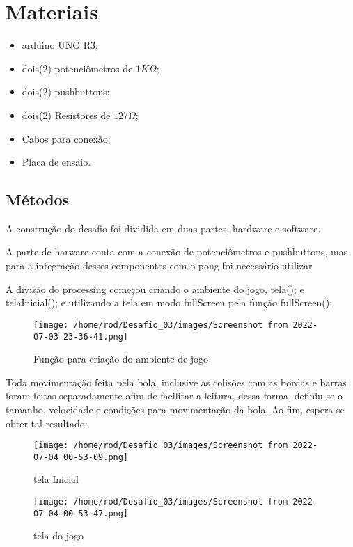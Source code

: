 \documentclass[conference]{IEEEtran}
\begin{document}
\section{Materiais}
 \begin{itemize}
     \item arduino UNO R3;
     \item dois(2) potenciômetros de $ 1K\Omega $;
     \item dois(2) pushbuttons;
     \item dois(2) Resistores de $ 127\Omega $;
     \item Cabos para conexão;
     \item Placa de ensaio.
 \end{itemize}

\subsection{Métodos}
A construção do desafio foi dividida em duas partes, hardware e software. 

A parte de harware conta com a conexão de potenciômetros e pushbuttons, mas para a integração desses componentes com o pong
foi necessário utilizar 

A divisão do processing começou criando o ambiente do jogo, tela(); e telaInicial(); e utilizando a tela em modo fullScreen
pela função fullScreen();


 \begin{figure}[htbp]
    \centerline{\texttt{[image: /home/rod/Desafio\_03/images/Screenshot from 2022-07-03 23-36-41.png]}}
    \caption{Função para criação do ambiente de jogo}
    \label{fig}
    \end{figure}


Toda movimentação feita pela bola, inclusive as colisões com as bordas e barras foram feitas separadamente afim de 
facilitar a leitura, dessa forma, definiu-se o tamanho, velocidade e condições para movimentação da bola. Ao fim, 
espera-se obter tal resultado:

\begin{figure}[htbp]
    \centerline{\texttt{[image: /home/rod/Desafio\_03/images/Screenshot from 2022-07-04 00-53-09.png]}}
    \caption{tela Inicial}
    \label{fig}
    \end{figure}

    \begin{figure}[htbp]
        \centerline{\texttt{[image: /home/rod/Desafio\_03/images/Screenshot from 2022-07-04 00-53-47.png]}}
        \caption{tela do jogo}
        \label{fig}
        \end{figure}
\end{document}
